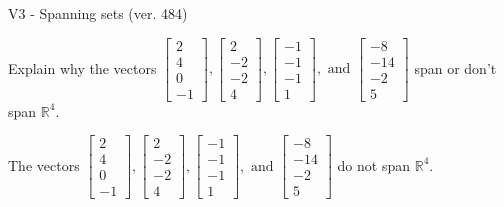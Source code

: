 \begin{exercise}
  \begin{exerciseTitle}V3 - Spanning sets (ver. 484)\end{exerciseTitle}
  \begin{exerciseStatement}
    Explain why the vectors \(\left[\begin{array}{r}
2 \\
4 \\
0 \\
-1
\end{array}\right] , \left[\begin{array}{r}
2 \\
-2 \\
-2 \\
4
\end{array}\right] , \left[\begin{array}{r}
-1 \\
-1 \\
-1 \\
1
\end{array}\right] , \text{ and } \left[\begin{array}{r}
-8 \\
-14 \\
-2 \\
5
\end{array}\right]\) span or don't span \(\mathbb{R}^4\). 
	


  \end{exerciseStatement}
  \begin{exerciseAnswer}
   The vectors \(\left[\begin{array}{r}
2 \\
4 \\
0 \\
-1
\end{array}\right] , \left[\begin{array}{r}
2 \\
-2 \\
-2 \\
4
\end{array}\right] , \left[\begin{array}{r}
-1 \\
-1 \\
-1 \\
1
\end{array}\right] , \text{ and } \left[\begin{array}{r}
-8 \\
-14 \\
-2 \\
5
\end{array}\right]\) 
  	 do not  
	span \(\mathbb{R}^4\).
  


  \end{exerciseAnswer}
\end{exercise}